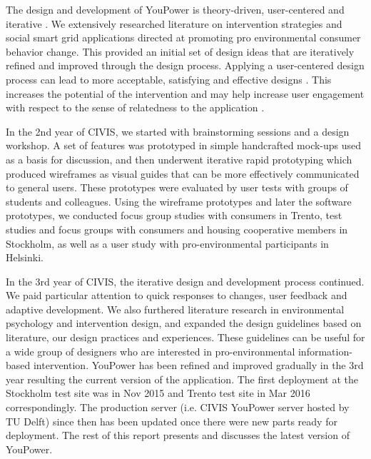 

The design and development of YouPower is theory-driven, user-centered and iterative \citep{Leffingwell2000,Leffingwell2011}. We extensively researched literature on intervention strategies and social smart grid applications directed at promoting pro environmental consumer behavior change. This provided an initial set of design ideas that are iteratively refined and improved through the design process. Applying a user-centered design process can lead to more acceptable, satisfying and effective designs \citep{Brynjarsdottir2012}. This increases the potential of the intervention \citep{dick2012empowering} and may help increase user engagement with respect to the sense of relatedness to the application \citep{pierce2003state,schwartz2015people,edward2015review}. 

In the 2nd year of CIVIS, we started with brainstorming sessions and a design workshop. A set of features was prototyped in simple handcrafted mock-ups used as a basis for discussion, and then underwent iterative rapid prototyping which produced wireframes as visual guides that can be more effectively communicated to general users. These prototypes were evaluated by user tests with groups of students and colleagues. Using the wireframe prototypes and later the software prototypes, we conducted focus group studies with consumers in Trento, test studies and focus groups with consumers and housing cooperative members in Stockholm, as well as a user study with pro-environmental participants in Helsinki. 

In the 3rd year of CIVIS, the iterative design and development process continued. We paid particular attention to quick responses to changes, user feedback and adaptive development. We also furthered literature research in environmental psychology and intervention design, and expanded the design guidelines based on literature, our design practices and experiences. These guidelines can be useful for a wide group of designers who are interested in pro-environmental information-based intervention. YouPower has been refined and improved gradually in the 3rd year resulting the current version of the application. The first deployment at the Stockholm test site was in Nov 2015 and Trento test site in Mar 2016 correspondingly. The production server (i.e. CIVIS YouPower server hosted by TU Delft) since then has been updated once there were new parts ready for deployment.  
The rest of this report presents and discusses the latest version of YouPower. 

 
 

